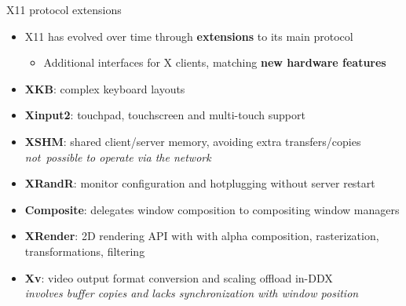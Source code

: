 \begin{frame}{X11 protocol extensions}
  \begin{itemize}
  \item X11 has evolved over time through \textbf{extensions} to its main protocol
    \begin{itemize}
    \item Additional interfaces for X clients, matching \textbf{new hardware features}
    \end{itemize}
  \item \textbf{XKB}: complex keyboard layouts
  \item \textbf{Xinput2}: touchpad, touchscreen and multi-touch support
  \item \textbf{XSHM}: shared client/server memory, avoiding extra transfers/copies\\
    \textit{not\ possible to operate via the network}
  \item \textbf{XRandR}: monitor configuration and hotplugging without server restart
  \item \textbf{Composite}: delegates window composition to compositing window managers
  \item \textbf{XRender}: 2D rendering API with with alpha composition, rasterization, transformations, filtering
  \item \textbf{Xv}: video output format conversion and scaling offload in-DDX\\
    \textit{involves buffer copies and lacks synchronization with window position}
  \end{itemize}
\end{frame}

